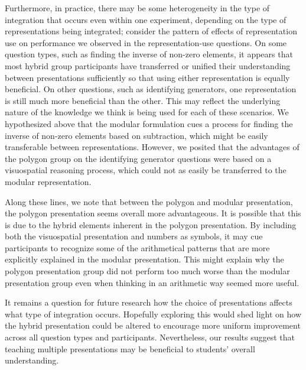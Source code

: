 \documentclass[man,10pt]{apa6}
\begin{document}
Furthermore, in practice, there may be some heterogeneity in the type of integration that occurs even within one experiment, depending on the type of representations being integrated; consider the pattern of effects of representation use on performance we observed in the representation-use questions. On some question types, such as finding the inverse of non-zero elements, it appears that most hybrid group participants have transferred or unified their understanding between presentations sufficiently so that using either representation is equally beneficial. On other questions, such as identifying generators, one representation is still much more beneficial than the other. This may reflect the underlying nature of the knowledge we think is being used for each of these scenarios. We hypothesized above that the modular formulation cues a process for finding the inverse of non-zero elements based on subtraction, which might be easily transferable between representations. However, we posited that the advantages of the polygon group on the identifying generator questions were based on a visuospatial reasoning process, which could not as easily be transferred to the modular representation. \par
Along these lines, we note that between the polygon and modular presentation, the polygon presentation seems overall more advantageous. It is possible that this is due to the hybrid elements inherent in the polygon presentation. By including both the visuospatial presentation and numbers as symbols, it may cue participants to recognize some of the arithmetical patterns that are more explicitly explained in the modular presentation. This might explain why the polygon presentation group did not perform too much worse than the modular presentation group even when thinking in an arithmetic way seemed more useful. \par
It remains a question for future research how the choice of presentations affects what type of integration occurs. Hopefully exploring this would shed light on how the hybrid presentation could be altered to encourage more uniform improvement across all question types and participants. Nevertheless, our results suggest that teaching multiple presentations may be beneficial to students' overall understanding. 
\end{document}
